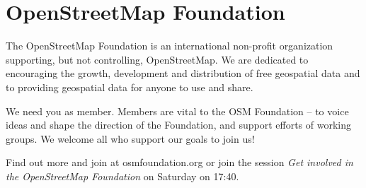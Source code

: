 \newpage
\section*{OpenStreetMap Foundation}
\label{osmf}
\pagestyle{osmf}
The OpenStreetMap Foundation is an
international non-profit organization
supporting, but not controlling,
OpenStreetMap. We are dedicated to
encouraging the growth, development and
distribution of free geospatial data and to
providing geospatial data for anyone to use
and share.

We need you as member. Members are vital
to the OSM Foundation -- to voice ideas
and shape the direction of the Foundation,
and support efforts of working groups. We
welcome all who support our goals to join us!

Find out more and join at osmfoundation.org
or join the session \emph{Get involved in the OpenStreetMap Foundation} on Saturday on 17:40.
